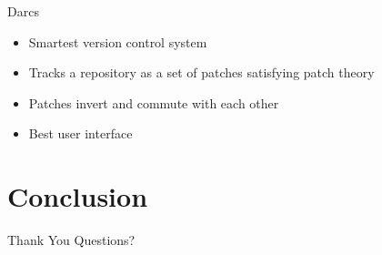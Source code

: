 \documentclass{beamer}
\begin{document}
\begin{frame}{Darcs}
  \begin{itemize}
  \item Smartest version control system
  \item Tracks a repository as a set of patches satisfying patch theory
  \item Patches invert and commute with each other
  \item Best user interface
  \end{itemize}
\end{frame}

\section{Conclusion}

\begin{frame}{Thank You}
  Questions?
\end{frame}
\end{document}

